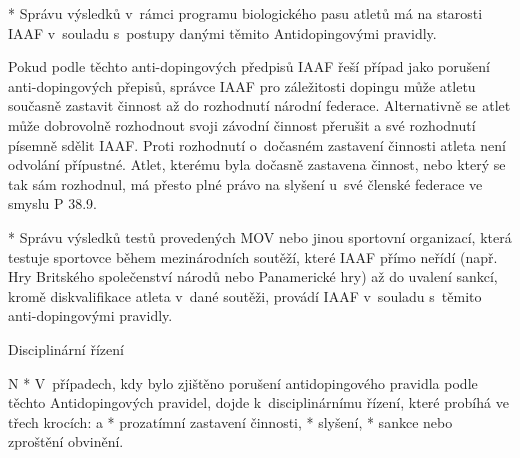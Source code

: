 * Správu výsledků v~rámci programu biologického pasu atletů má na starosti IAAF v~souladu s~postupy danými těmito Antidopingovými pravidly.

Pokud podle těchto anti-dopingových předpisů IAAF řeší případ jako porušení anti-dopingových přepisů, správce IAAF pro záležitosti dopingu může atletu současně zastavit činnost až do rozhodnutí národní federace. Alternativně se atlet může dobrovolně rozhodnout svoji závodní činnost přerušit a své rozhodnutí písemně sdělit IAAF. Proti rozhodnutí o~dočasném zastavení činnosti atleta není odvolání přípustné. Atlet, kterému byla dočasně zastavena činnost, nebo který se tak sám rozhodnul, má přesto plné právo na slyšení u~své členské federace ve smyslu P 38.9.

* Správu výsledků testů provedených MOV nebo jinou sportovní organizací, která testuje sportovce během mezinárodních soutěží, které IAAF přímo neřídí (např. Hry Britského společenství národů nebo Panamerické hry) až do uvalení sankcí, kromě diskvalifikace atleta v~dané soutěži, provádí IAAF v~souladu s~těmito anti-dopingovými pravidly.
\enditems

\secc Disciplinární řízení

\begitems \style N
* V~případech, kdy bylo zjištěno porušení antidopingového pravidla podle těchto Antidopingových pravidel, dojde k~disciplinárnímu řízení, které probíhá ve třech krocích:
  \begitems \style a
  * prozatímní zastavení činnosti,
  * slyšení,
  * sankce nebo zproštění obvinění.
  \enditems

